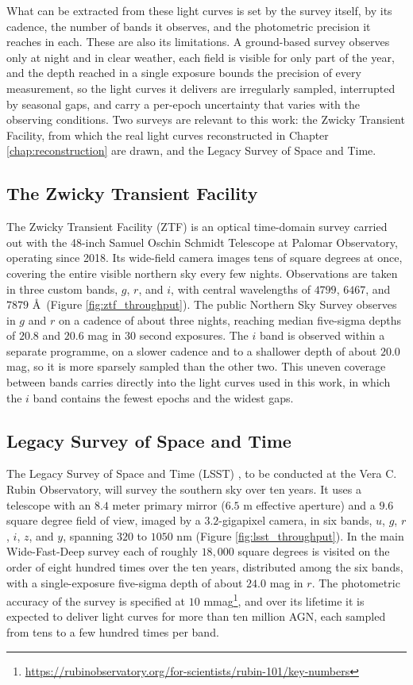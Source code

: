 What can be extracted from these light curves is set by the survey itself, by its cadence, the number of bands it observes, and the photometric precision it reaches in each. These are also its limitations. A ground-based survey observes only at night and in clear weather, each field is visible for only part of the year, and the depth reached in a single exposure bounds the precision of every measurement, so the light curves it delivers are irregularly sampled, interrupted by seasonal gaps, and carry a per-epoch uncertainty that varies with the observing conditions. Two surveys are relevant to this work: the Zwicky Transient Facility, from which the real light curves reconstructed in Chapter \ref{chap:reconstruction} are drawn, and the Legacy Survey of Space and Time.

\subsection{The Zwicky Transient Facility}
\label{ssec:ZTF}
The Zwicky Transient Facility (ZTF) \parencite{Bellm2019ZTF,Graham2019ZTFsciobj} is an optical time-domain survey carried out with the 48-inch Samuel Oschin Schmidt Telescope at Palomar Observatory, operating since 2018. Its wide-field camera images tens of square degrees at once, covering the entire visible northern sky every few nights. Observations are taken in three custom bands, $g$, $r$, and $i$, with central wavelengths of $4799$, $6467$, and $7879$ \AA\ (Figure \ref{fig:ztf_throughput}). The public Northern Sky Survey observes in $g$ and $r$ on a cadence of about three nights, reaching median five-sigma depths of $20.8$ and $20.6$ mag in $30$ second exposures. The $i$ band is observed within a separate programme, on a slower cadence and to a shallower depth of about $20.0$ mag, so it is more sparsely sampled than the other two. This uneven coverage between bands carries directly into the light curves used in this work, in which the $i$ band contains the fewest epochs and the widest gaps.

\subsection{Legacy Survey of Space and Time}
\label{ssec:LSST}
The Legacy Survey of Space and Time (LSST) \parencite{Ivezi2019LSST}, to be conducted at the Vera C. Rubin Observatory, will survey the southern sky over ten years. It uses a telescope with an $8.4$ meter primary mirror ($6.5$ m effective aperture) and a $9.6$ square degree field of view, imaged by a $3.2$-gigapixel camera, in six bands, $u$, $g$, $r$, $i$, $z$, and $y$, spanning $320$ to $1050$ nm (Figure \ref{fig:lsst_throughput}). In the main Wide-Fast-Deep survey each of roughly $18{,}000$ square degrees is visited on the order of eight hundred times over the ten years, distributed among the six bands, with a single-exposure five-sigma depth of about $24.0$ mag in $r$. The photometric accuracy of the survey is specified at $10$ mmag\footnote{\url{https://rubinobservatory.org/for-scientists/rubin-101/key-numbers}}, and over its lifetime it is expected to deliver light curves for more than ten million AGN, each sampled from tens to a few hundred times per band.


